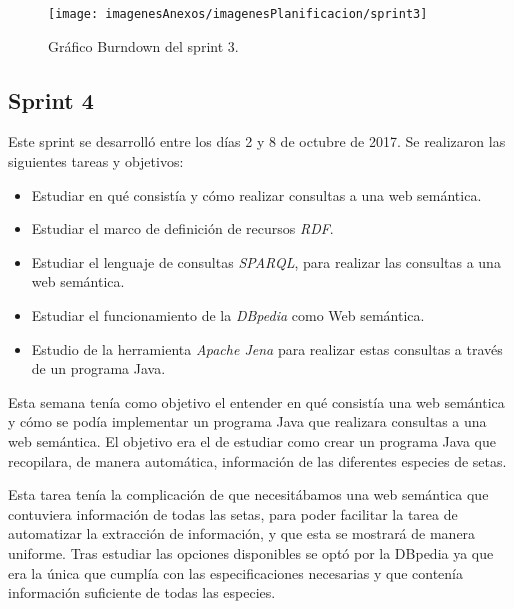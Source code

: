 \begin{figure}[h]
    \begin{center}%
        \begin{center}%
          \texttt{[image: imagenesAnexos/imagenesPlanificacion/sprint3]}%
          \caption{Gráfico Burndown del sprint 3.}%
          \label{figSprint3}%
        \end{center}%
  	\end{center}%
\end{figure}%

\newpage

\subsection{Sprint 4}

Este sprint se desarrolló entre los días 2 y 8 de octubre de 2017. Se realizaron las siguientes tareas y objetivos:

\begin{itemize}
	\item Estudiar en qué consistía y cómo realizar consultas a una web semántica.
	\item Estudiar el marco de definición de recursos \textit{RDF}.
	\item Estudiar el lenguaje de consultas \textit{SPARQL}, para realizar las consultas a una web semántica.
	\item Estudiar el funcionamiento de la \textit{DBpedia} como Web semántica.
	\item Estudio de la herramienta \textit{Apache Jena} para realizar estas consultas a través de un programa Java.
	
\end{itemize}

Esta semana tenía como objetivo el entender en qué consistía una web semántica y cómo se podía implementar un programa Java que realizara consultas a una web semántica. El objetivo era el de estudiar como crear un programa Java que recopilara, de manera automática, información de las diferentes especies de setas.

Esta tarea tenía la complicación de que necesitábamos una web semántica que contuviera información de todas las setas, para poder facilitar la tarea de automatizar la extracción de información, y que esta se mostrará de manera uniforme. Tras estudiar las opciones disponibles se optó por la DBpedia ya que era la única que cumplía con las especificaciones necesarias y que contenía información suficiente de todas las especies.

